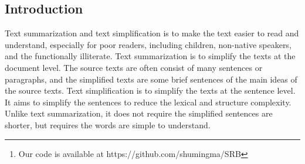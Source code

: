 \documentclass{clv3}
\begin{document}
\begin{CJK*}{UTF8}{gbsn}
\maketitle
\begin{abstract}
	Text summarization and text simplification are two major ways to simplify the text for poor readers, including children, non-native speakers, and the functionally illiterate. Text summarization is to produce a brief summary of the main ideas of the text, while text simplification aims to reduce the linguistic complexity of the text and retain the original meaning. Recently, most approaches for text summarization and text simplification are based on the sequence-to-sequence model, which achieves much success in many text generation tasks. However, although the generated simplified texts are similar to source texts literally, they have low semantic relevance. In this work, our goal is to improve semantic relevance between source texts and simplified texts for text summarization and text simplification. We 
	introduce a Semantic Relevance Based neural model to encourage high semantic similarity between texts and summaries. In our model, the source text is represented by a gated attention encoder, while the summary representation is produced by a decoder. Besides, the similarity score between the representations is maximized during training. Our experiments show that the proposed model outperforms the state-of-the-art systems on two benchmark corpus\footnote{Our code is available at https://github.com/shumingma/SRB}.
\end{abstract}


\section{Introduction}

Text summarization and text simplification is to make the text easier to read and understand, especially for poor readers, including children, non-native speakers, and the functionally illiterate. Text summarization is to simplify the texts at the document level. The source texts are often consist of many sentences or paragraphs, and the simplified texts are some brief sentences of the main ideas of the source texts. Text simplification is to simplify the texts at the sentence level. It aims to simplify the sentences to reduce the lexical and structure complexity. Unlike text summarization, it does not require the simplified sentences are shorter, but requires the words are simple to understand.


\end{CJK*}
\end{document}
